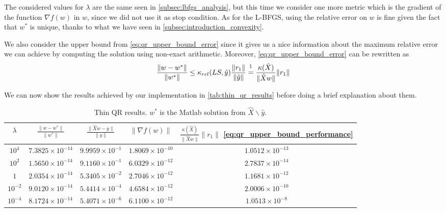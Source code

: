\noindent The considered values for $\lambda$ are the same seen in \ref{subsec:lbfgs_analysis}, but this time we consider one more metric which is the gradient of the function $\nabla f(w)$ in $w$, since we did not use it as stop condition. As for the L-BFGS, using the relative error on $w$ is fine given the fact that $w^*$ is unique, thanks to what we have seen in \ref{subsec:introduction_convexity}.
\vspace{3mm}

\noindent We also consider the upper bound from \eqref{eq:qr_upper_bound_error} since it gives us a nice information about the maximum relative error we can achieve by computing the solution using non-exact arithmetic. Moreover, \eqref{eq:qr_upper_bound_error} can be rewritten as 
\begin{equation}
    \frac{\lVert w - w^* \lVert}{\lVert w^*\rVert}\leq\kappa_{rel}(LS,\hat{y})\frac{\lVert r_1\rVert}{\lVert \hat{y} \rVert}\stackrel{\footnotemark}{=} \frac{\kappa(\hat{X})}{\lVert \hat{X}w \rVert}\lVert r_1 \rVert
    \label{eq:qr_upper_bound_performance}
\end{equation}

\noindent We can now show the results achieved by our implementation in \autoref{tab:thin_qr_results} before doing a brief explanation about them.
\begin{table}[H]
\centering
\begin{tabular}{c|c|c|c|c} \hline \hline
    $\lambda$ & $\frac{\lVert w - w^* \lVert}{\lVert w^*\rVert}$ & $\frac{\lVert \hat{X}w - y \lVert }{\lVert y \lVert}$ & $\lVert \nabla f(w) \lVert$ & $\frac{\kappa(\hat{X})}{\lVert \hat{X}w \rVert}\lVert r_1 \rVert$ \eqref{eq:qr_upper_bound_performance} \\ \hline \hline
    
    \rowcolor{gray!30} $10^4$ & $7.3825 \times 10^{-14}$ & $9.9959 \times 10^{-1}$& $1.8069 \times 10^{-10}$ & $1.0512 \times 10^{-13}$ \\
    
    $10^2$ & $1.5650\times 10^{-14}$ & $9.1160 \times 10^{-1}$ & $6.0329 \times 10^{-12}$ & $2.7837\times 10^{-14}$ \\
    
    \rowcolor{gray!30} $1$ & $2.0354 \times 10^{-14}$ & $5.3405 \times 10^{-2}$ & $2.7046 \times 10^{-12}$ & $1.1681\times 10^{-12}$ \\
    
    $10^{-2}$ & $9.0120 \times 10^{-14}$ & $5.4414 \times 10^{-4}$ & $4.6584 \times 10^{-12}$ & $2.0006\times 10^{-10}$ \\
    
    \rowcolor{gray!30} $10^{-4}$ & $8.1724 \times 10^{-14}$ & $5.4071 \times 10^{-6}$ & $6.1100 \times 10^{-12}$ & $1.0513\times 10^{-8}$ \\
    \hline \hline
\end{tabular}
\caption{Thin QR results. $w^{*}$ is the Matlab solution from $\hat{X} \backslash\hat{y}$.}
\label{tab:thin_qr_results}
\end{table}

